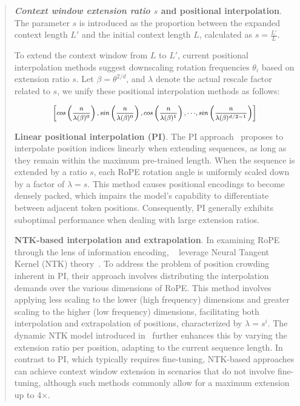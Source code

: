 \begin{abstract}
\textbf{\emph{Context window extension ratio $s$} and positional interpolation}. The parameter $s$ is introduced as the proportion between the expanded context length $L'$ and the initial context length $L$, calculated as $s=\frac{L'}{L}$.

To extend the context window from $L$ to $L'$, current positional interpolation methods suggest downscaling rotation frequencies $\theta_i$ based on extension ratio $s$. Let $\beta=\theta^{2/d}$, and $\lambda$ denote the actual rescale factor related to $s$, we   unify these positional interpolation methods as follows:

\begin{equation}	
	\fontsize{7.5}{7.5} \selectfont
	\label{eq:unified_rope}
	\begin{aligned}
		\left[cos\left(\frac{n}{\lambda(\beta)^0}\right), sin \left(\frac{n}{\lambda(\beta)^0}\right), cos\left(\frac{n}{\lambda(\beta)^1}\right), \cdot\cdot\cdot,  sin \left(\frac{n}{\lambda(\beta)^{d/2-1}}\right) \right]   
	\end{aligned}
\end{equation}

\textbf{Linear positional interpolation (PI)}. The PI approach~\cite{pi} proposes to interpolate position indices linearly when extending sequences, as long as they remain within the maximum pre-trained length. When the sequence is extended by a ratio $s$, each RoPE rotation angle is uniformly scaled down by a factor of $\lambda=s$. This method causes positional encodings to become densely packed, which impairs the model's capability to differentiate between adjacent token positions. Consequently, PI generally exhibits suboptimal performance when dealing with large extension ratios.

\textbf{NTK-based interpolation and extrapolation}. In examining RoPE through the lens of information encoding, ~\cite{ntk,dynamicntk} leverage Neural Tangent Kernel (NTK) theory~\cite{jacot2018neural,tancik2020fourier}. To address the problem of position crowding inherent in PI, their approach involves distributing the interpolation demands over the various dimensions of RoPE. This method involves applying less scaling to the lower (high frequency) dimensions and greater scaling to the higher (low frequency) dimensions, facilitating both interpolation and extrapolation of positions, characterized by $\lambda=s^{i}$. The dynamic NTK model introduced in~\cite{dynamicntk} further enhances this by varying the extension ratio per position, adapting to the current sequence length. In contrast to PI, which typically requires fine-tuning, NTK-based approaches can achieve context window extension in scenarios that do not involve fine-tuning, although such methods commonly allow for a maximum extension up to 4$\times$.


\end{abstract}
